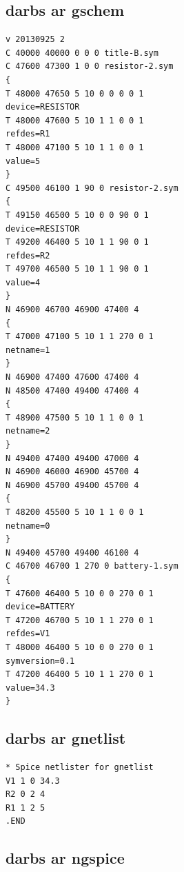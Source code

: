 \documentclass{report}
\begin{document}
\subsection{darbs ar gschem}
\begin{verbatim}
v 20130925 2
C 40000 40000 0 0 0 title-B.sym
C 47600 47300 1 0 0 resistor-2.sym
{
T 48000 47650 5 10 0 0 0 0 1
device=RESISTOR
T 48000 47600 5 10 1 1 0 0 1
refdes=R1
T 48000 47100 5 10 1 1 0 0 1
value=5
}
C 49500 46100 1 90 0 resistor-2.sym
{
T 49150 46500 5 10 0 0 90 0 1
device=RESISTOR
T 49200 46400 5 10 1 1 90 0 1
refdes=R2
T 49700 46500 5 10 1 1 90 0 1
value=4
}
N 46900 46700 46900 47400 4
{
T 47000 47100 5 10 1 1 270 0 1
netname=1
}
N 46900 47400 47600 47400 4
N 48500 47400 49400 47400 4
{
T 48900 47500 5 10 1 1 0 0 1
netname=2
}
N 49400 47400 49400 47000 4
N 46900 46000 46900 45700 4
N 46900 45700 49400 45700 4
{
T 48200 45500 5 10 1 1 0 0 1
netname=0
}
N 49400 45700 49400 46100 4
C 46700 46700 1 270 0 battery-1.sym
{
T 47600 46400 5 10 0 0 270 0 1
device=BATTERY
T 47200 46700 5 10 1 1 270 0 1
refdes=V1
T 48000 46400 5 10 0 0 270 0 1
symversion=0.1
T 47200 46400 5 10 1 1 270 0 1
value=34.3
}
\end{verbatim}

\subsection{darbs ar gnetlist}
\begin{verbatim}
* Spice netlister for gnetlist
V1 1 0 34.3
R2 0 2 4
R1 1 2 5
.END
\end{verbatim}

\subsection{darbs ar ngspice}
\end{document}
